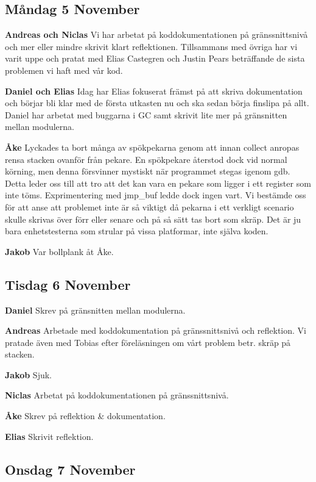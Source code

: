 \documentclass{article}
\begin{document}
\subsection{Måndag 5 November}
{\bf Andreas och Niclas} Vi har arbetat på koddokumentationen på gränssnittsnivå och mer eller mindre skrivit klart reflektionen. Tillsammans med övriga har vi varit uppe och pratat med Elias Castegren och Justin Pears beträffande de sista problemen vi haft med vår kod.

{\bf Daniel och Elias} Idag har Elias fokuserat främst på att skriva dokumentation och börjar bli klar med de första utkasten nu och ska sedan börja finslipa på allt. Daniel har arbetat med buggarna i GC samt skrivit lite mer på gränsnitten mellan modulerna.

{\bf Åke} Lyckades ta bort många av spökpekarna genom att innan collect anropas rensa stacken ovanför från pekare. En spökpekare återstod dock vid normal körning, men denna försvinner mystiskt när programmet stegas igenom gdb. Detta leder oss till att tro att det kan vara en pekare som ligger i ett register som inte töms. Exprimentering med jmp\_buf ledde dock ingen vart. Vi bestämde oss för att anse att problemet inte är så viktigt då pekarna i ett verkligt scenario skulle skrivas över förr eller senare och på så sätt tas bort som skräp. Det är ju bara enhetstesterna som strular på vissa platformar, inte själva koden.

{\bf Jakob} Var bollplank åt Åke.

\subsection{Tisdag 6 November}
{\bf Daniel} Skrev på gränsnitten mellan modulerna.

{\bf Andreas} Arbetade med koddokumentation på gränssnittsnivå och reflektion. Vi pratade även med Tobias efter föreläsningen om vårt problem betr. skräp på stacken. 

{\bf Jakob} Sjuk.

{\bf Niclas} Arbetat på koddokumentationen på gränssnittsnivå.

{\bf Åke} Skrev på reflektion \& dokumentation.

{\bf Elias} Skrivit reflektion.

\subsection{Onsdag 7 November}

\end{document}
